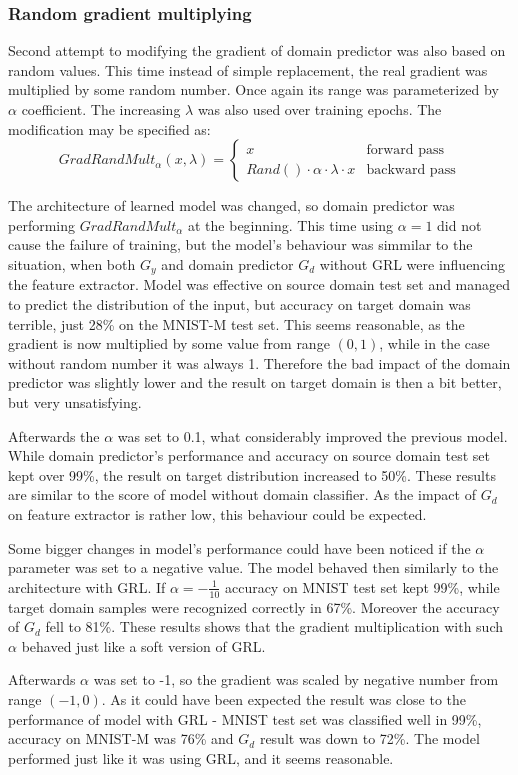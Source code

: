 \documentclass{article}
\begin{document}
\subsubsection{Random gradient multiplying}
Second attempt to modifying the gradient of domain predictor was also based on random values. This time instead of simple replacement, the real gradient was multiplied by some random number. Once again its range was parameterized by $\alpha$ coefficient. The increasing $\lambda$ was also used over training epochs. The modification may be specified as:
\begin{equation*}
GradRandMult_{\alpha}(x, \lambda) = \begin{cases}
x &\text{forward pass}\\
Rand() \cdot \alpha \cdot \lambda \cdot x &\text{backward pass}
\end{cases}
\end{equation*}
\par
The architecture of learned model was changed, so domain predictor was performing $GradRandMult_{\alpha}$ at the beginning. This time using $\alpha = 1$ did not cause the failure of training, but the model's behaviour was simmilar to the situation, when both $G_{y}$ and domain predictor $G_{d}$ without GRL were influencing the feature extractor. Model was effective on source domain test set and managed to predict the distribution of the input, but accuracy on target domain was terrible, just 28\% on the MNIST-M test set. This seems reasonable, as the gradient is now multiplied by some value from range $(0,1)$, while in the case without random number it was always 1. Therefore the bad impact of the domain predictor was slightly lower and the result on target domain is then a bit better, but very unsatisfying.
\par
Afterwards the $\alpha$ was set to 0.1, what considerably improved the previous model. While domain predictor's performance and accuracy on source domain test set kept over 99\%, the result on target distribution increased to 50\%. These results are similar to the score of model without domain classifier. As the impact of $G_{d}$ on feature extractor is rather low, this behaviour could be expected.
\par
Some bigger changes in model's performance could have been noticed if the $\alpha$ parameter was set to a negative value. The model behaved then similarly to the architecture with GRL. If $\alpha = -\frac{1}{10}$ accuracy on MNIST test set kept 99\%, while target domain samples were recognized correctly in 67\%. Moreover the accuracy of $G_{d}$ fell to 81\%. These results shows that the gradient multiplication with such $\alpha$ behaved just like a soft version of GRL.
\par
Afterwards $\alpha$ was set to -1, so the gradient was scaled by negative number from range $(-1, 0)$. As it could have been expected the result was close to the performance of model with GRL - MNIST test set was classified well in 99\%, accuracy on MNIST-M was 76\% and $G_{d}$ result was down to 72\%. The model performed just like it was using GRL, and it seems reasonable.
\end{document}
